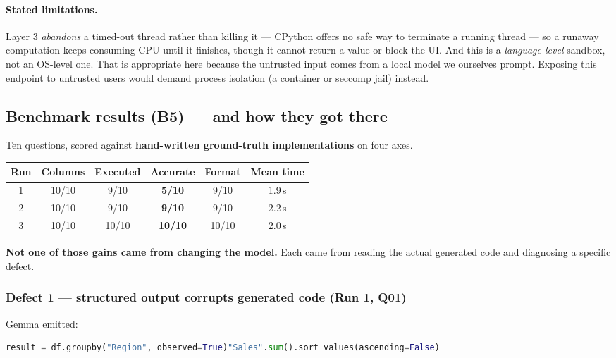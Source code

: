 \documentclass[11pt,a4paper]{article}
\begin{document}
\paragraph{Stated limitations.} Layer 3 \emph{abandons} a timed-out thread rather than
killing it --- CPython offers no safe way to terminate a running thread --- so a
runaway computation keeps consuming CPU until it finishes, though it cannot return a
value or block the UI. And this is a \emph{language-level} sandbox, not an OS-level
one. That is appropriate here because the untrusted input comes from a local model we
ourselves prompt. Exposing this endpoint to untrusted users would demand process
isolation (a container or seccomp jail) instead.

\subsection{Benchmark results (B5) --- and how they got there}
\label{sec:bench}

Ten questions, scored against \textbf{hand-written ground-truth implementations} on
four axes.

\begin{center}
\begin{tabular}{@{}cccccc@{}}
\toprule
\textbf{Run} & \textbf{Columns} & \textbf{Executed} & \textbf{Accurate} & \textbf{Format} & \textbf{Mean time} \\
\midrule
1 & 10/10 & 9/10  & \textbf{5/10}  & 9/10  & 1.9\,s \\
2 & 10/10 & 9/10  & \textbf{9/10}  & 9/10  & 2.2\,s \\
3 & 10/10 & 10/10 & \textbf{10/10} & 10/10 & 2.0\,s \\
\bottomrule
\end{tabular}
\end{center}

\textbf{Not one of those gains came from changing the model.} Each came from reading
the actual generated code and diagnosing a specific defect.

\subsubsection*{Defect 1 --- structured output corrupts generated code (Run 1, Q01)}

Gemma emitted:

\begin{lstlisting}[language=Python]
result = df.groupby("Region", observed=True)"Sales".sum().sort_values(ascending=False)
\end{lstlisting}
\end{document}
